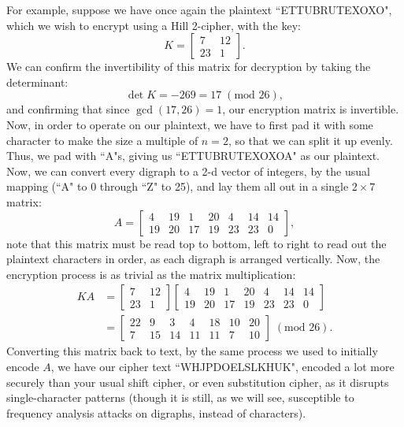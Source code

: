 \documentclass{article}
\begin{document}
\noindent For example, suppose we have once again the plaintext ``ETTUBRUTEXOXO", which we wish to encrypt using a Hill 2-cipher, with the key:
\[
    K = \begin{bmatrix}
        7 & 12 \\
        23 & 1
    \end{bmatrix}.
\]
We can confirm the invertibility of this matrix for decryption by taking the determinant:
\[
    \det K = -269 = 17 \; (\text{mod } 26),
\]
and confirming that since $\gcd (17, 26) = 1$, our encryption matrix is invertible. Now, in order to operate on our plaintext, we have to first pad it with some character to make the size a multiple of $n = 2$, so that we can split it up evenly. Thus, we pad with ``A"s, giving us ``ETTUBRUTEXOXOA" as our plaintext. Now, we can convert every digraph to a 2-d vector of integers, by the usual mapping (``A" to 0 through ``Z" to 25), and lay them all out in a single $2 \times 7$ matrix:
\[
    A = \begin{bmatrix}
        4 & 19 & 1 & 20 & 4 & 14 & 14 \\
        19 & 20 & 17 & 19 & 23 & 23 & 0
    \end{bmatrix},
\]
note that this matrix must be read top to bottom, left to right to read out the plaintext characters in order, as each digraph is arranged vertically. Now, the encryption process is as trivial as the matrix multiplication:
\begin{align*}
    K A &= \begin{bmatrix}
        7 & 12 \\
        23 & 1
    \end{bmatrix} \begin{bmatrix}
        4 & 19 & 1 & 20 & 4 & 14 & 14 \\
        19 & 20 & 17 & 19 & 23 & 23 & 0
    \end{bmatrix} \\
    &= \begin{bmatrix}
        22 & 9 & 3 & 4 & 18 & 10 & 20 \\
        7 & 15 & 14 & 11 & 11 & 7 & 10
    \end{bmatrix} \; (\text{mod } 26).
\end{align*}
Converting this matrix back to text, by the same process we used to initially encode $A$, we have our cipher text ``WHJPDOELSLKHUK", encoded a lot more securely than your usual shift cipher, or even substitution cipher, as it disrupts single-character patterns (though it is still, as we will see, susceptible to frequency analysis attacks on digraphs, instead of characters).
\end{document}
